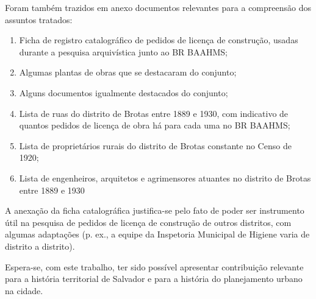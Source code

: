 Foram também trazidos em anexo documentos relevantes para a compreensão dos assuntos tratados:

\begin{enumerate}
\item Ficha de registro catalográfico de pedidos de licença de construção, usadas durante a pesquisa arquivística junto ao BR BAAHMS;
\item Algumas plantas de obras que se destacaram do conjunto;
\item Alguns documentos igualmente destacados do conjunto;
\item Lista de ruas do distrito de Brotas entre 1889 e 1930, com indicativo de quantos pedidos de licença de obra há para cada uma no BR BAAHMS;
\item Lista de proprietários rurais do distrito de Brotas constante no Censo de 1920;
\item Lista de engenheiros, arquitetos e agrimensores atuantes no distrito de Brotas entre 1889 e 1930
\end{enumerate}

A anexação da ficha catalográfica justifica-se pelo fato de poder ser instrumento útil na pesquisa de pedidos de licença de construção de outros distritos, com algumas adaptações (p. ex., a equipe da Inspetoria Municipal de Higiene varia de distrito a distrito).

Espera-se, com este trabalho, ter sido possível apresentar contribuição relevante para a história territorial de Salvador e para a história do planejamento urbano na cidade.


